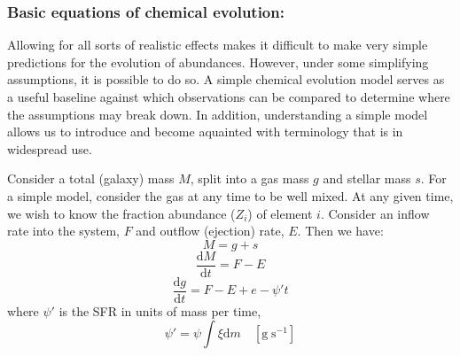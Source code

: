 \documentclass{article}
\begin{document}
\subsubsection{Basic equations of chemical evolution:}
Allowing for all sorts of realistic effects makes it difficult to make
very simple predictions for the evolution of abundances. However, under
some simplifying assumptions, it is possible to do so. A simple chemical
evolution model serves as a useful baseline against which observations
can be compared to determine where the assumptions may break down.
In addition, understanding a simple model allows us to introduce and
become aquainted with terminology that is in widespread use.

Consider a total (galaxy) mass $M$, split into a gas mass
$g$ and stellar mass $s$. For a simple model, consider the
gas at any time to be well mixed. At any given time, we wish
to know the fraction abundance ($Z_{i}$) of element $i$.
Consider an inflow rate into the system, $F$ and outflow
(ejection) rate, $E$. Then we have:
\[
    M = g + s
    \]
\[
    \frac{\mathrm{d}M}{\mathrm{d}t} = F - E
    \]
\[
    \frac{\mathrm{d}g}{\mathrm{d}t} = F - E + e - \psi't
    \]
where $\psi'$ is the SFR in units of mass per time,
\[
    \psi' = \psi\int\xi\textrm{d}m\quad[\mathrm{g\;s}^{-1}]
    \]
\end{document}
